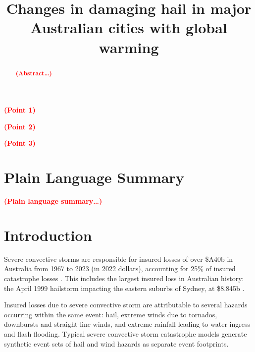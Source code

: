 \documentclass[]{agujournal2019}\usepackage[]{graphicx}\usepackage[]{xcolor}
\newcommand*{\todo}[1]{\textbf{\textcolor{red}{(#1)}}}
\begin{document}
\title{Changes in damaging hail in major Australian cities with global warming}




\begin{keypoints}
\item \todo{Point 1}
\item \todo{Point 2}
\item \todo{Point 3}
\end{keypoints}

\begin{abstract}
      \todo{Abstract\ldots}
\end{abstract}

\section*{Plain Language Summary}
\todo{Plain language summary\ldots}

\section{Introduction}

Severe convective storms are responsible for insured losses of over \$A40b in Australia from 1967 to 2023 (in 2022 dollars), accounting for 25\% of insured catastrophe losses \cite{ICA_2024}. This includes the largest insured loss in Australian history: the 
April 1999 hailstorm impacting the eastern suburbs of Sydney, at \$8.845b
\cite<in 2002 dollars, >{ICA_2024}.

Insured losses due to severe convective storm are attributable to several hazards occurring within the same event: hail, extreme winds due to tornados, downbursts and straight-line winds, and extreme rainfall leading to water ingress and flash flooding. Typical severe convective storm catastrophe models generate synthetic event sets of hail and wind hazards as separate event footprints.
\end{document}
